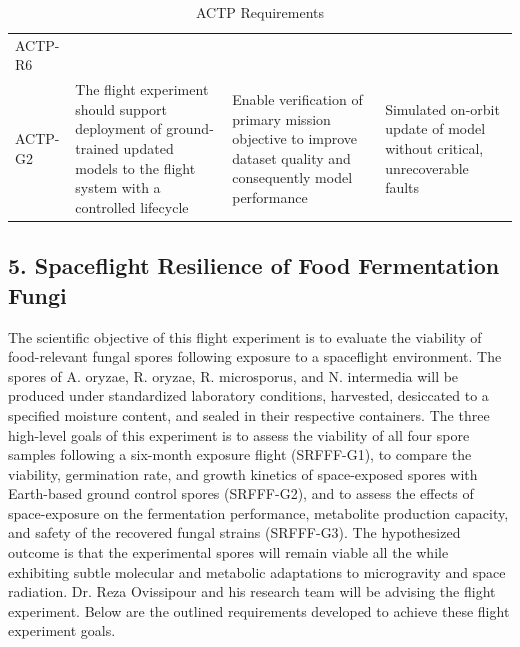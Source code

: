 \documentclass[conf]{new-aiaa}
\begin{document}
\begin{table}[H]
\begin{tabularx}{\textwidth}{@{}>{\raggedright\arraybackslash}m{2.4cm}YYY@{}}
    ACTP-R6\\ACTP-G2 &
    The flight experiment should support deployment of ground-trained updated models to the flight system with a controlled lifecycle &
    Enable verification of primary mission objective to improve dataset quality and consequently model performance &
    Simulated on-orbit update of model without critical, unrecoverable faults \\
    \bottomrule
    \end{tabularx}
    \caption{ACTP Requirements}
    \label{tab:actp_requirements}
\end{table}


\clearpage
\subsection{5. Spaceflight Resilience of Food Fermentation Fungi}

The scientific objective of this flight experiment is to evaluate the viability of food-relevant fungal spores following exposure to a spaceflight environment. The spores of A. oryzae, R. oryzae, R. microsporus, and N. intermedia will be produced under standardized laboratory conditions, harvested, desiccated to a specified moisture content, and sealed in their respective containers. The three high-level goals of this experiment is to assess the viability of all four spore samples following a six-month exposure flight (SRFFF-G1), to compare the viability, germination rate, and growth kinetics of space-exposed spores with Earth-based ground control spores (SRFFF-G2), and to assess the effects of space-exposure on the fermentation performance, metabolite production capacity, and safety of the recovered fungal strains (SRFFF-G3). The hypothesized outcome is that the experimental spores will remain viable all the while exhibiting subtle molecular and metabolic adaptations to microgravity and space radiation. Dr. Reza Ovissipour and his research team will be advising the flight experiment. Below are the outlined requirements developed to achieve these flight experiment goals. \cite{thilakarathna-srfff}
\end{document}
